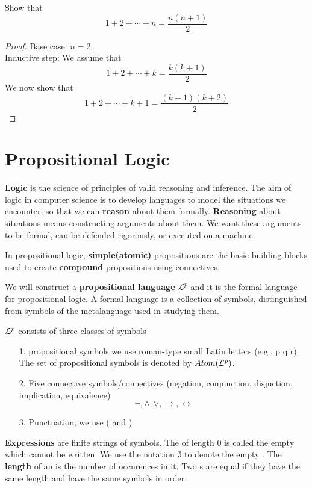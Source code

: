 \documentclass[english, 11pt]{article}
\begin{document}
  \begin{exmp}
    Show that
    \[ 1 + 2 + \cdots + n = \frac{n(n+1)}{2} \]
  \end{exmp}
 \begin{proof}
   Base case: $n = 2$. \\
   Inductive step: We assume that
   \[ 1 + 2 + \cdots + k = \frac{k(k+1)}{2} \]
   We now show that
   \[ 1 + 2 + \cdots + k + 1 = \frac{(k+1)(k+2)}{2} \]
 \end{proof}

 \section{Propositional Logic}

 \begin{defn}[logic]
   \label{logic}
   \textbf{Logic} is the science of principles of valid reasoning and inference. The aim of logic in computer science is to develop languages to model the situations we encounter, so that we can \textbf{reason} about them formally. \textbf{Reasoning} about situations means constructing arguments about them. We want these arguments to be formal, can be defended rigorously, or executed on a machine.

   In propositional logic, \textbf{simple(atomic)} propositions are the basic building blocks used to create \textbf{compound} propositions using connectives.
 \end{defn}

 We will construct a \textbf{propositional language} $\mathcal{L}^p$ and it is the formal language for propositional logic. A formal language is a collection of symbols, distinguished from symbols of the metalanguage used in studying them.

 $\mathcal{L}^p$ consists of three classes of symbols
 \begin{itemize}
   \item[1.] propositional symbols we use roman-type small Latin letters (e.g., p q r). The set of propositional symbols is denoted by $Atom(\mathcal{L}^p)$.
   \item[2.] Five connective symbols/connectives (negation, conjunction, disjuction, implication, equivalence)
   \[ \neg, \land, \lor, \rightarrow, \leftrightarrow \]
   \item[3.] Punctuation; we use ( and )
 \end{itemize}

 \begin{defn}[expression]
   \label{expression}
   \textbf{Expressions} are finite strings of symbols. The  of length 0 is called the empty  which cannot be written. We use the notation $\emptyset$ to denote the empty . The \textbf{length} of an  is the number of occurences in it. Two s are equal if they have the same length and have the same symbols in order.
 \end{defn}
\end{document}
